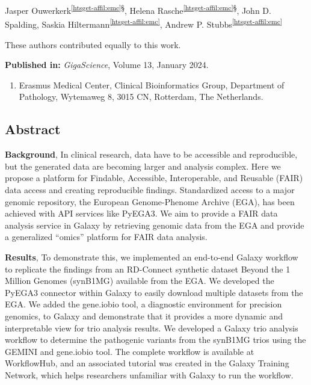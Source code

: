 \cleartorightpage
\setcounter{NAT@ctr}{-1}
\chapter*{}\label{chapter:htsget}




Jasper Ouwerkerk\textsuperscript{\ref{htsget-affil:emc}§},
Helena Rasche\textsuperscript{\ref{htsget-affil:emc}§},
John D. Spalding,
Saskia Hiltermann\textsuperscript{\ref{htsget-affil:emc}},
Andrew P. Stubbs\textsuperscript{\ref{htsget-affil:emc}}

{\color{chaptergrey}{§}} These authors contributed equally to this work.

\textbf{Published in:} \emph{GigaScience}, Volume 13, January 2024.\\

\small
\begin{enumerate}
 \itemsep-0.5em
 \item Erasmus Medical Center, Clinical Bioinformatics Group, Department of Pathology, Wytemaweg 8, 3015 CN, Rotterdam, The Netherlands.\label{htsget-affil:emc}
\end{enumerate}
\normalsize


\section*{Abstract}
\textbf{Background},
In clinical research, data have to be accessible and reproducible, but the generated data are becoming larger and analysis complex. Here we propose a platform for Findable, Accessible, Interoperable, and Reusable (FAIR) data access and creating reproducible findings. Standardized access to a major genomic repository, the European Genome-Phenome Archive (EGA), has been achieved with API services like PyEGA3. We aim to provide a FAIR data analysis service in Galaxy by retrieving genomic data from the EGA and provide a generalized ``omics'' platform for FAIR data analysis.

\textbf{Results},
To demonstrate this, we implemented an end-to-end Galaxy workflow to replicate the findings from an RD-Connect synthetic dataset Beyond the 1 Million Genomes (synB1MG) available from the EGA. We developed the PyEGA3 connector within Galaxy to easily download multiple datasets from the EGA. We added the gene.iobio tool, a diagnostic environment for precision genomics, to Galaxy and demonstrate that it provides a more dynamic and interpretable view for trio analysis results. We developed a Galaxy trio analysis workflow to determine the pathogenic variants from the synB1MG trios using the GEMINI and gene.iobio tool. The complete workflow is available at WorkflowHub, and an associated tutorial was created in the Galaxy Training Network, which helps researchers unfamiliar with Galaxy to run the workflow.

